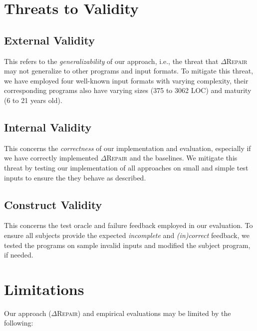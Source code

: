 \documentclass[acmsmall,screen,review,anonymous]{acmart}
\newcounter{todocounter}
\newcommand{\todo}[1]{\marginpar{$|$}\textcolor{red}{\stepcounter{todocounter}\footnote[\thetodocounter]{\textcolor{red}{\textbf{TODO }}\textit{#1}}}}
\renewcommand{\todo}[1]{}
\newcommand{\approach}{\textsc{$\Delta$Repair}\xspace}
\begin{document}

\section{Threats to Validity}
\label{sec:threats}


\subsection{External Validity} This refers to the \textit{generalizability} of our approach, i.e., 
the threat that \approach may not generalize to other programs and input formats. 
To mitigate this threat, we have employed four well-known input formats with varying complexity, their corresponding programs also have  varying sizes (375 to 3062 LOC) and maturity (6 to 21 years old). 


\subsection{Internal Validity} This concerns the \textit{correctness} of our implementation and evaluation, especially if we have correctly implemented \approach and the baselines. We mitigate this threat by testing our implementation of all approaches on small and simple test inputs to ensure the they behave as described. 


\subsection{Construct Validity} This concerns the test oracle and failure feedback employed in our evaluation. To ensure all subjects provide the expected \textit{incomplete} and \textit{(in)correct} feedback, we tested the programs on sample invalid inputs and modified the subject program, if needed. 


\section{Limitations}
Our approach (\approach) and empirical evaluations may be limited by the following: %
\end{document}
